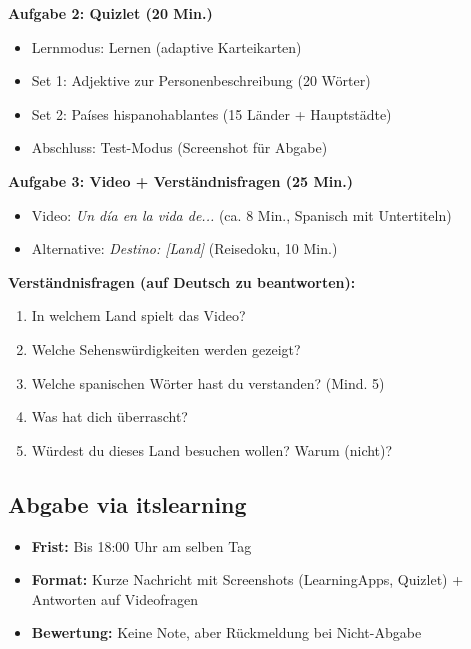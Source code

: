 \documentclass[11pt,a4paper]{article}
\begin{document}
\vspace{0.5em}
\textbf{Aufgabe 2: Quizlet (20 Min.)}
\begin{itemize}
    \item Lernmodus: \glqq{}Lernen\grqq{} (adaptive Karteikarten)
    \item Set 1: Adjektive zur Personenbeschreibung (20 Wörter)
    \item Set 2: Países hispanohablantes (15 Länder + Hauptstädte)
    \item Abschluss: \glqq{}Test\grqq{}-Modus (Screenshot für Abgabe)
\end{itemize}

\vspace{0.5em}
\textbf{Aufgabe 3: Video + Verständnisfragen (25 Min.)}
\begin{itemize}
    \item Video: \textit{\glqq{}Un día en la vida de...\grqq{}} (ca. 8 Min., Spanisch mit Untertiteln)
    \item Alternative: \textit{\glqq{}Destino: [Land]\grqq{}} (Reisedoku, 10 Min.)
\end{itemize}

\textbf{Verständnisfragen (auf Deutsch zu beantworten):}
\begin{enumerate}
    \item In welchem Land spielt das Video?
    \item Welche Sehenswürdigkeiten werden gezeigt?
    \item Welche spanischen Wörter hast du verstanden? (Mind. 5)
    \item Was hat dich überrascht?
    \item Würdest du dieses Land besuchen wollen? Warum (nicht)?
\end{enumerate}

\subsection{Abgabe via itslearning}

\begin{itemize}
    \item \textbf{Frist:} Bis 18:00 Uhr am selben Tag
    \item \textbf{Format:} Kurze Nachricht mit Screenshots (LearningApps, Quizlet) + Antworten auf Videofragen
    \item \textbf{Bewertung:} Keine Note, aber Rückmeldung bei Nicht-Abgabe
\end{itemize}
\end{document}
